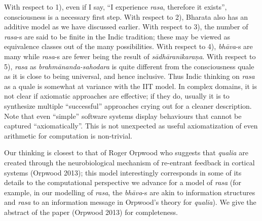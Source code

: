 With respect to 1), even if I say, “I experience \textsl{rasa}, therefore it exists”, consciousness is a necessary first step. With respect to 2), Bharata also has an additive model as we have discussed earlier. With respect to 3), the number of \textsl{rasa}-s are said to be finite in the Indic tradition; these may be viewed as equivalence classes out of the many possibilities. With respect to 4), \textsl{bhāva}-s are many while \textsl{rasa}-s are fewer being the result of \textsl{sādhāranīkaraṇa}. With respect to 5), \textsl{rasa} as  \textsl{brahmānanda-sahodara} is quite different from the consciousness quale as it is close to being universal, and hence inclusive. Thus Indic thinking on \textsl{rasa} as a quale is somewhat at variance with the IIT model. In complex domains, it is not clear if axiomatic approaches are effective; if they do, usually it is to synthesize multiple “successful” approaches crying out for a cleaner description. Note that even “simple” software systems display behaviours that cannot be captured “axiomatically”. This is not unexpected as useful axiomatization of even arithmetic for computation is non-trivial.

Our thinking is closest to that of Roger Orpwood who suggests that \textsl{qualia} are created through the neurobiological mechanism of re-entrant feedback in cortical systems (Orpwood 2013); this model interestingly corresponds in some of its details to the computational perspective we advance for a model of \textsl{rasa} (for example, in our modelling of \textsl{rasa}, the \textsl{bhāva}-s are akin to information structures and \textsl{rasa} to an information message in Orpwood’s theory for \textsl{qualia}). We give the abstract of the paper (Orpwood 2013) for completeness.


